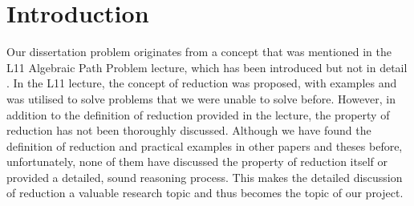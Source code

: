 \documentclass[a4paper,12pt,twoside,openright]{report}
\begin{document}
\pagestyle{empty}
\singlespacing

\onehalfspacing

\singlespacing


\setcounter{page}{0}
\pagestyle{plain}
\tableofcontents
\listoffigures


\renewcommand{\lstlistlistingname}{List of Listings}
%
%

\onehalfspacing


\chapter{Introduction}
\setcounter{page}{1} 

%
%

Our dissertation problem originates from a concept that was mentioned in the L11 Algebraic Path Problem lecture, which has been introduced but not in detail \cite{griffin_2017}.  In the L11 lecture, the concept of reduction was proposed, with examples and was utilised to solve problems that we were unable to solve before. However, in addition to the definition of reduction provided in the lecture, the property of reduction has not been thoroughly discussed. Although we have found the definition of reduction and practical examples in other papers and theses before, unfortunately, none of them have discussed the property of reduction itself or provided a detailed, sound reasoning process.  This makes the detailed discussion of reduction a valuable research topic and thus becomes the topic of our project.
\end{document}
